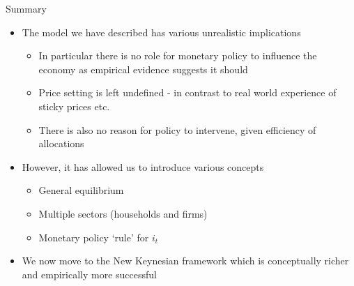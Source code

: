 \begin{frame}{Summary}

\begin{itemize}
\item	The model we have described has various unrealistic implications
	\begin{itemize}
	\item	In particular there is no role for monetary policy to influence the economy as empirical evidence suggests it should
	\item	Price setting is left undefined - in contrast to real world experience of sticky prices etc.
	\item	There is also no reason for policy to intervene, given efficiency of allocations
	\end{itemize}
\vspace{2mm}	
\item	However, it has allowed us to introduce various concepts
	\begin{itemize}
	\item	General equilibrium
	\item	Multiple sectors (households and firms)
	\item	Monetary policy `rule' for $i_{t}$
	\end{itemize}
\vspace{2mm}	
\item	We now move to the New Keynesian framework which is conceptually richer and empirically more successful
\end{itemize}

\end{frame}
